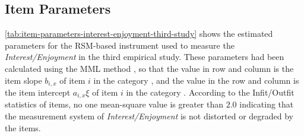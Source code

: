 \subsection{Item Parameters}

\autoref{tab:item-parameters-interest-enjoyment-third-study} shows the estimated parameters for the RSM-based instrument used to measure the \emph{Interest/Enjoyment} in the third empirical study. These parameters had been calculated using the MML method \cite{BockAitkin1981}, so that the value in row  and column  is the item slope $b_{i,x}$ of item $i$ in the category , and the value in the row  and column  is the item intercept $a_{i,x}\xi$ of item $i$ in the category . According to the Infit/Outfit statistics of items, no one mean-square value is greater than $2.0$ indicating that the measurement system of \emph{Interest/Enjoyment} is not distorted or degraded by the items.

